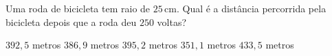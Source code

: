 \noindent\parbox{\linewidth}{

Uma roda de bicicleta tem raio de $25$\,cm. Qual é a distância percorrida pela bicicleta depois que a roda deu $250$ voltas?

$     392{,}5$ metros
$386{,}9$ metros
$395{,}2$ metros
$351{,}1$ metros
$433{,}5$ metros



}


